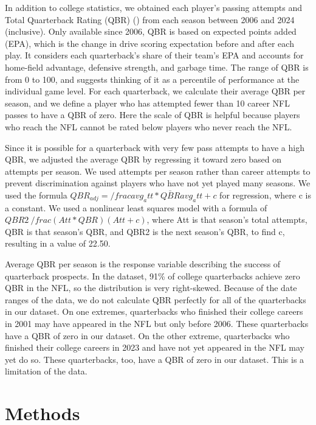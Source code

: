 \documentclass{article}
\begin{document}
In addition to college statistics, we obtained each player's passing attempts and Total Quarterback Rating (QBR) (\cite{burke_how_2016}) from each season between 2006 and 2024 (inclusive). Only available since 2006, QBR is based on expected points added (EPA), which is the change in drive scoring expectation before and after each play. It considers each quarterback's share of their team's EPA and accounts for home-field advantage, defensive strength, and garbage time. The range of QBR is from 0 to 100, and \textcite{burke_how_2016} suggests thinking of it as a percentile of performance at the individual game level. For each quarterback, we calculate their average QBR per season, and we define a player who has attempted fewer than 10 career NFL passes to have a QBR of zero. Here the scale of QBR is helpful because players who reach the NFL cannot be rated below players who never reach the NFL. 

Since it is possible for a quarterback with very few pass attempts to have a high QBR, we adjusted the average QBR by regressing it toward zero based on attempts per season. We used attempts per season rather than career attempts to prevent discrimination against players who have not yet played many seasons. We used the formula $QBR_{adj}=/frac{avg_att*\bar{QBR}}{avg_att+c}$ for regression, where c is a constant. We used a nonlinear least squares model with a formula of $QBR2~/frac{(Att * QBR)}{(Att + c)}$, where Att is that season's total attempts, QBR is that season's QBR, and QBR2 is the next season's QBR, to find c, resulting in a value of 22.50. 

Average QBR per season is the response variable describing the success of quarterback prospects. In the dataset, 91\% of college quarterbacks achieve zero QBR in the NFL, so the distribution is very right-skewed. Because of the date ranges of the data, we do not calculate QBR perfectly for all of the quarterbacks in our dataset. On one extremes, quarterbacks who finished their college careers in 2001 may have appeared in the NFL but only before 2006. These quarterbacks have a QBR of zero in our dataset. On the other extreme, quarterbacks who finished their college careers in 2023 and have not yet appeared in the NFL may yet do so. These quarterbacks, too, have a QBR of zero in our dataset. This is a limitation of the data.

\section{Methods}
\label{sec:methods}
\end{document}
